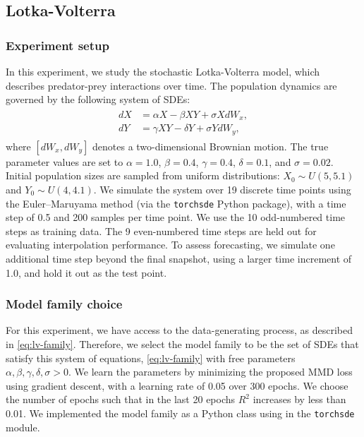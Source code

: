 




\clearpage

\subsection{Lotka-Volterra}
\label{app:lv-app}
\subsubsection{Experiment setup}
In this experiment, we study the stochastic Lotka-Volterra model, which describes predator-prey interactions over time. The population dynamics are governed by the following system of SDEs:
\begin{align}
\begin{split}
\label{eq:lv-family}
    dX &= \alpha X - \beta XY + \sigma X dW_x, \\
    dY &= \gamma XY - \delta Y + \sigma Y dW_y,
\end{split}
\end{align}
where $[dW_x, dW_y]$ denotes a two-dimensional Brownian motion. The true parameter values are set to $\alpha = 1.0$, $\beta = 0.4$, $\gamma = 0.4$, $\delta = 0.1$, and $\sigma = 0.02$. Initial population sizes are sampled from uniform distributions: $X_0 \sim U(5, 5.1)$ and $Y_0 \sim U(4, 4.1)$. We simulate the system over 19 discrete time points using the Euler–Maruyama method (via the \texttt{torchsde} Python package), with a time step of 0.5 and 200 samples per time point. We use the 10 odd-numbered time steps as training data. The 9 even-numbered time steps are held out for evaluating interpolation performance. To assess forecasting, we simulate one additional time step beyond the final snapshot, using a larger time increment of 1.0, and hold it out as the test point.


\subsubsection{Model family choice}
\label{app:LV_implementation}
For this experiment, we have access to the data-generating process, as described in \cref{eq:lv-family}. Therefore, we select the model family to be the set of SDEs that satisfy this system of equations, \cref{eq:lv-family} with free parameters $\alpha, \beta, \gamma, \delta, \sigma>0$. We learn the parameters by minimizing the proposed MMD loss using gradient descent, with a learning rate of 0.05 over 300 epochs. We choose the number of epochs such that in the last 20 epochs $R^2$ increases by less than 0.01. We implemented the model family as a Python class using in the \texttt{torchsde} \citep{li2020scalable} module.


